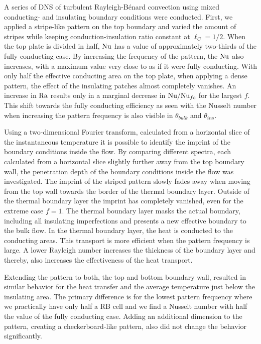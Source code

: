 A series of DNS of turbulent Rayleigh-B\'enard convection using mixed
conducting- and insulating boundary conditions were conducted.  First, we
applied a stripe-like pattern on the top boundary and varied the amount of
stripes while keeping conduction-insulation ratio constant at $\ell_C=1/2$.
When the top plate is divided in half, $\text{Nu}$ has a value of approximately
two-thirds of the fully conducting case.  By increasing the frequency of the
pattern, the $\text{Nu}$ also increases, with a maximum value very close to as if
it were fully conducting.  With only half the effective conducting area on the
top plate, when applying a dense pattern, the effect of the insulating patches
almost completely vanishes.  An increase in $\text{Ra}$ results only in a marginal
decrease in $\text{Nu}/\text{Nu}_{fc}$ for the largest $f$.  This shift towards the
fully conducting efficiency as seen with the Nusselt number when increasing
the pattern frequency is also visible in $\theta_{bulk}$ and $\theta_{ins}$.

Using a two-dimensional Fourier transform, calculated from a horizontal slice
of the instantaneous temperature it is possible to identify the imprint of the
boundary conditions inside the flow.  By comparing different spectra, each
calculated from a horizontal slice slightly further away from the top boundary
wall, the penetration depth of the boundary conditions inside the flow was
investigated.  The imprint of the striped pattern slowly fades away when
moving from the top wall towards the border of the thermal boundary layer.
Outside of the thermal boundary layer the imprint has completely vanished,
even for the extreme case $f=1$.  The thermal boundary layer masks the actual
boundary, including all insulating imperfections and presents a new effective
boundary to the bulk flow.  In the thermal boundary layer, the heat is
conducted to the conducting areas.  This transport is more efficient when the
pattern frequency is large.  A lower Rayleigh number increases the thickness
of the boundary layer and thereby, also increases the effectiveness of the
heat transport.

Extending the pattern to both, the top and bottom boundary wall, resulted in
similar behavior for the heat transfer and the average temperature just below the
insulating area.  The primary difference is for the lowest pattern frequency
where we practically have only half a RB cell and we find a Nusselt number
with half the value of the fully conducting case.  Adding an additional
dimension to the pattern, creating a checkerboard-like pattern, also did not
change the behavior significantly.

